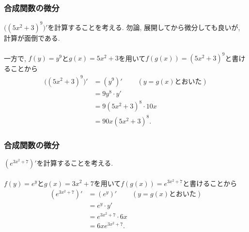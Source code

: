 

\begin{frame}
\frametitle{合成関数の微分}


$\big((5x^2+3)^9\big)'$を計算することを考える. 
勿論, 展開してから微分しても良いが, 計算が面倒である. \\
\ \\

一方で, $f(y)=y^9$と$g(x)=5x^2+3$を用いて$f(g(x))=(5x^2+3)^9$と書けることから
\begin{align*} 
\big((5x^2+3)^9\big)' &= (y^9)'  \ \ \ \ \ \ \ \ \ \ (y=g(x)\text{とおいた})\\
& =9y^8 \cdot y' \\
&=9(5x^2+3)^8 \cdot 10x \\
&= 90x(5x^2+3)^8. 
\end{align*}
\end{frame}





\begin{frame}
\frametitle{合成関数の微分}


$(e^{3x^2+7})'$を計算することを考える. \\
\ \\

$f(y)=e^y$と$g(x)=3x^2+7$を用いて$f(g(x))=e^{3x^2+7}$と書けることから
\begin{align*} 
(e^{3x^2+7})' &= (e^y)'  \ \ \ \ \ \ \ \ \ \ (y=g(x)\text{とおいた})\\
& =e^y \cdot y' \\
&=e^{3x^2+7} \cdot 6x \\
&= 6x e^{3x^2+7}. 
\end{align*}


\end{frame}





